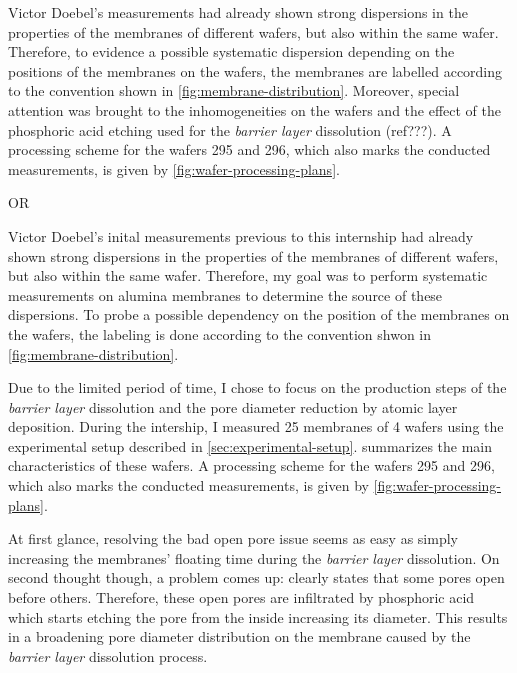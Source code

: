 \documentclass[../thesis.tex]{subfiles}
\begin{document}
        Victor Doebel's measurements had already shown strong dispersions in the properties of the membranes of different wafers, but also within the same wafer. Therefore, to evidence a possible systematic dispersion depending on the positions of the membranes on the wafers, the membranes are labelled according to the convention shown in \cref{fig:membrane-distribution}. Moreover, special attention was brought to the inhomogeneities on the wafers and the effect of the phosphoric acid etching used for the \textit{barrier layer} dissolution (ref???). A processing scheme for the wafers 295 and 296, which also marks the conducted measurements, is given by \cref{fig:wafer-processing-plans}.
        \medskip

        OR
        \medskip

        Victor Doebel's inital measurements previous to this internship had already shown strong dispersions in the properties of the membranes of different wafers, but also within the same wafer. Therefore, my goal was to perform systematic measurements on alumina membranes to determine the source of these dispersions. To probe a possible dependency on the position of the membranes on the wafers, the labeling is done according to the convention shwon in \cref{fig:membrane-distribution}.

        Due to the limited period of time, I chose to focus on the production steps of the \textit{barrier layer} dissolution and the pore diameter reduction by atomic layer deposition. During the intership, I measured 25 membranes of 4 wafers using the experimental setup described in \cref{sec:experimental-setup}.  summarizes the main characteristics of these wafers. A processing scheme for the wafers 295 and 296, which also marks the conducted measurements, is given by \cref{fig:wafer-processing-plans}.
        \medskip

        

        At first glance, resolving the bad open pore issue seems as easy as simply increasing the membranes' floating time during the \textit{barrier layer} dissolution. On second thought though, a problem comes up:  clearly states that some pores open before others. Therefore, these open pores are infiltrated by phosphoric acid which starts etching the pore from the inside increasing its diameter. This results in a broadening pore diameter distribution on the membrane caused by the \textit{barrier layer} dissolution process.
\end{document}
